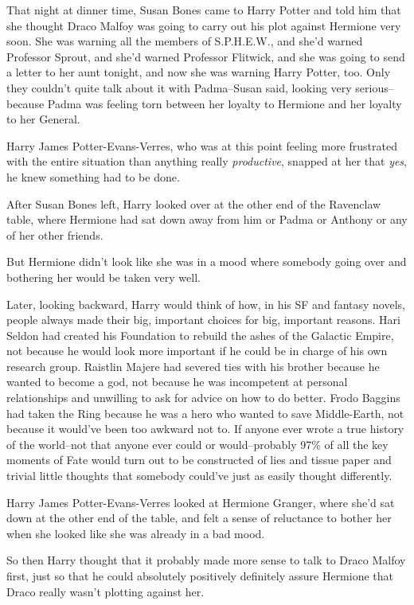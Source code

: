 \later

That night at dinner time, Susan Bones came to Harry Potter and told him that she thought Draco Malfoy was going to carry out his plot against Hermione very soon. She was warning all the members of S.P.H.E.W., and she'd warned Professor Sprout, and she'd warned Professor Flitwick, and she was going to send a letter to her aunt tonight, and now she was warning Harry Potter, too. Only they couldn't quite talk about it with Padma\---Susan said, looking very serious\---because Padma was feeling torn between her loyalty to Hermione and her loyalty to her General.

Harry James Potter-Evans-Verres, who was at this point feeling more frustrated with the entire situation than anything really \emph{productive}, snapped at her that \emph{yes}, he knew something had to be done.

After Susan Bones left, Harry looked over at the other end of the Ravenclaw table, where Hermione had sat down away from him or Padma or Anthony or any of her other friends.

But Hermione didn't look like she was in a mood where somebody going over and bothering her would be taken very well.

Later, looking backward, Harry would think of how, in his SF and fantasy novels, people always made their big, important choices for big, important reasons. Hari Seldon had created his Foundation to rebuild the ashes of the Galactic Empire, not because he would look more important if he could be in charge of his own research group. Raistlin Majere had severed ties with his brother because he wanted to become a god, not because he was incompetent at personal relationships and unwilling to ask for advice on how to do better. Frodo Baggins had taken the Ring because he was a hero who wanted to save Middle-Earth, not because it would've been too awkward not to. If anyone ever wrote a true history of the world\---not that anyone ever could or would\---probably 97\% of all the key moments of Fate would turn out to be constructed of lies and tissue paper and trivial little thoughts that somebody could've just as easily thought differently.

Harry James Potter-Evans-Verres looked at Hermione Granger, where she'd sat down at the other end of the table, and felt a sense of reluctance to bother her when she looked like she was already in a bad mood.

So then Harry thought that it probably made more sense to talk to Draco Malfoy first, just so that he could absolutely positively definitely assure Hermione that Draco really wasn't plotting against her.

